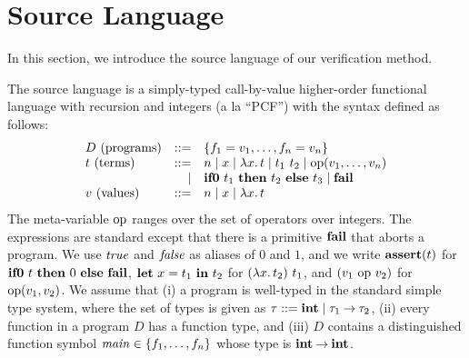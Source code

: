 \vspace{-5pt}
\section{Source Language}
\label{sec:language}
In this section, we introduce the source language of our verification method.

The source language is a simply-typed call-by-value higher-order
functional language with recursion and integers (a la ``PCF'') with the
syntax defined as follows:
\[
\begin{array}{lrl}
D\text{ (programs)} &::=& \{f_1 = v_1, \dots, f_n = v_n\} \\
t\text{ (terms)}
  &::=& n \mid x \mid \lambda{x}.\,{t} \mid t_1\ t_2 \mid \mathrm{op}({v_1,\dots,v_n}) \\
 &\mid& \mathbf{if0}~{t_1}~\mathbf{then}~{t_2}~\mathbf{else}~{t_3} \mid \mathbf{fail} \\
v\text{ (values)} &::=& n \mid x \mid \lambda{x}.\,{t} \\
\end{array}
\]
The meta-variable $\mathrm{op}$ ranges over the set of operators over integers.
The expressions are standard except that there is a primitive $\mathbf{fail}$
that aborts a program.  We use $\mathit{true}$ and $\mathit{false}$ as aliases of $0$
and $1$, and we write $\mathbf{assert}({t})$ for $\mathbf{if0}~{t}~\mathbf{then}~{0}~\mathbf{else}~{\mathbf{fail}}$,
$\mathbf{let}\ {x} = {t_1}\ \mathbf{in}\ {t_2}$ for $(\lambda{x}.\,{t_2})\ t_1$, and $(v_1\ \mathrm{op}\ v_2)$ for $\mathrm{op}({v_1,v_2})$.  We
assume that (i) a program is well-typed in the standard simple type system,
where the set of types is given as $\tau ::= \mathbf{int} \mid {\tau_1}\mathbin{\rightarrow}{\tau_2}$, (ii)
every function in a program $D$ has a function type, and (iii) $D$ contains a
distinguished function symbol $\mathit{main} \in \{{f_1,\dots,f_n}\}$ whose type
is ${\mathbf{int}}\mathbin{\rightarrow}{\mathbf{int}}$.


